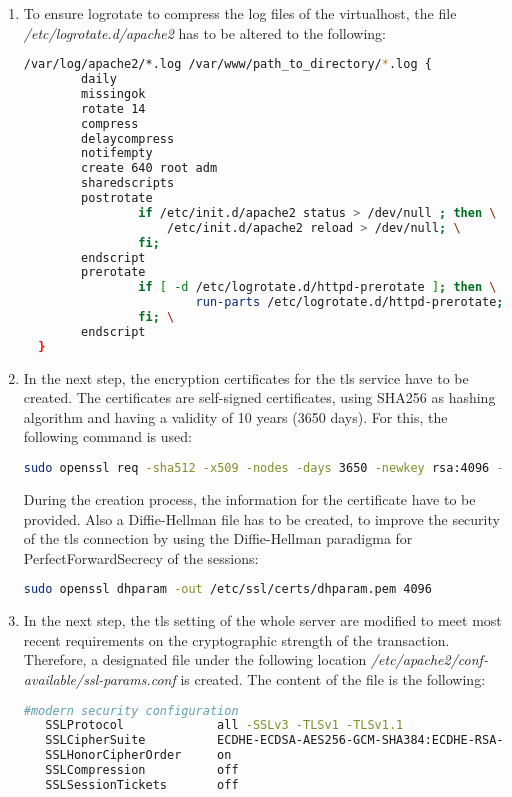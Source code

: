 \begin{enumerate}
  \begin{lstlisting}
   sudo touch /var/www/path_to_directory/error.log
   sudo touch /var/www/path_to_directory/access.log
  \end{lstlisting}
  \item To ensure logrotate to compress the log files of the virtualhost, the file \emph{/etc/logrotate.d/apache2} has to be altered to the following:
  \begin{lstlisting}[language=bash]
   /var/log/apache2/*.log /var/www/path_to_directory/*.log {
        daily
        missingok
        rotate 14
        compress
        delaycompress
        notifempty
        create 640 root adm
        sharedscripts
        postrotate
                if /etc/init.d/apache2 status > /dev/null ; then \
                    /etc/init.d/apache2 reload > /dev/null; \
                fi;
        endscript
        prerotate
                if [ -d /etc/logrotate.d/httpd-prerotate ]; then \
                        run-parts /etc/logrotate.d/httpd-prerotate; \
                fi; \
        endscript
  }
  \end{lstlisting}
  
  \item In the next step, the encryption certificates for the tls service have to be created. The certificates are self-signed certificates, using SHA256 as 
  hashing algorithm and having a validity of 10 years (3650 days). For this, the following command is used:
  \begin{lstlisting}[language=bash]
   sudo openssl req -sha512 -x509 -nodes -days 3650 -newkey rsa:4096 -keyout /etc/ssl/private/[servername].key -out /etc/ssl/certs/[servername].crt
  \end{lstlisting}
  During the creation process, the information for the certificate have to be provided. Also a Diffie-Hellman file has to be created, to improve the security of the tls connection 
  by using the Diffie-Hellman paradigma for PerfectForwardSecrecy of the sessions:
  \begin{lstlisting}[language=bash]
   sudo openssl dhparam -out /etc/ssl/certs/dhparam.pem 4096
  \end{lstlisting}
  \item In the next step, the tls setting of the whole server are modified to meet most recent requirements on the cryptographic strength of the transaction. Therefore, a 
  designated file under the following location \emph{/etc/apache2/conf-available/ssl-params.conf} is created. The content of the file is the following:
  \begin{lstlisting}[language=bash]
   #modern security configuration
   SSLProtocol             all -SSLv3 -TLSv1 -TLSv1.1
   SSLCipherSuite          ECDHE-ECDSA-AES256-GCM-SHA384:ECDHE-RSA-AES256-GCM-SHA384:ECDHE-ECDSA-CHACHA20-POLY1305:ECDHE-RSA-CHACHA20-POLY1305:ECDHE-ECDSA-AES128-GCM-SHA256:ECDHE-RSA-AES128-GCM-SHA256:ECDHE-ECDSA-AES256-SHA384:ECDHE-RSA-AES256-SHA384:ECDHE-ECDSA-AES128-SHA256:ECDHE-RSA-AES128-SHA256
   SSLHonorCipherOrder     on
   SSLCompression          off
   SSLSessionTickets       off


\end{lstlisting}
\end{enumerate}
